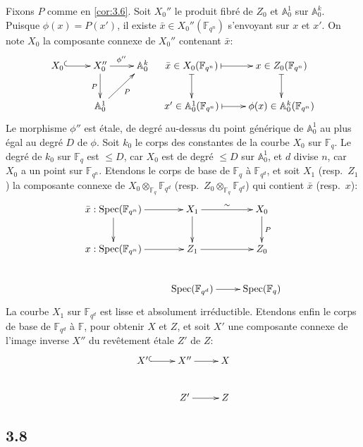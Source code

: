 \documentclass[10pt,a4paper]{article}
\theoremstyle{plain}
\theoremstyle{definition}
\DeclareMathOperator{\Spec}{Spec}
\begin{document}
Fixons $P$ comme en \ref{cor:3.6}. Soit $X_0''$ le produit fibr\'e de $Z_0$ et $\mathbb{A}_0^1$ sur $\mathbb{A}_0^k$. Puisque $\phi(x) = P(x')$, il existe $\bar{x} \in X_0''(\mathbb{F}_{q^n})$ s'envoyant sur $x$ et $x'$. On note $X_0$ la composante connexe de $X_0''$ contenant $\bar{x}$:
\begin{equation}\label{eq:3.7.1}
\xymatrix{
X_0 \ar@{^{(}->}[r] & X_0'' \ar[r]^{\phi''} \ar[d]_{P} & \mathbb{A}_0^k \\
& \mathbb{A}_0^1 \ar[ur]_{P} &
}
\quad
\xymatrix{
\bar{x} \in X_0(\mathbb{F}_{q^n}) \ar@{|->}[d] \ar@{|->}[r] & x \in Z_0(\mathbb{F}_{q^n}) \ar@{|->}[d] \\
x' \in \mathbb{A}_0^1(\mathbb{F}_{q^n}) \ar@{|->}[r] & \phi(x) \in \mathbb{A}_0^k(\mathbb{F}_{q^n})
}
\end{equation}
Le morphisme $\phi''$ est \'etale, de degr\'e au-dessus du point g\'en\'erique de $\mathbb{A}_0^1$ au plus \'egal au degr\'e $D$ de $\phi$. Soit $k_0$ le corps des constantes de la courbe $X_0$ sur $\mathbb{F}_q$. Le degr\'e de $k_0$ sur $\mathbb{F}_q$ est $\leq D$, car $X_0$ est de degr\'e $\leq D$ sur $\mathbb{A}_0^1$, et $d$ divise $n$, car $X_0$ a un point sur $\mathbb{F}_{q^n}$. Etendons le corps de base de $\mathbb{F}_q$ \`a $\mathbb{F}_{q^d}$, et soit $X_1$ (resp.~$Z_1$) la composante connexe de $X_0 \otimes_{\mathbb{F}_q} \mathbb{F}_{q^d}$ (resp.~$Z_0 \otimes_{\mathbb{F}_q} \mathbb{F}_{q^d}$) qui contient $\bar{x}$ (resp.~$x$):
\begin{equation}\label{eq:3.7.2}
\xymatrix{
\bar{x}: \Spec(\mathbb{F}_{q^n}) \ar[r] \ar[d] & X_1 \ar[r]^{\sim} \ar[d] & X_0 \ar[d]^{P} \\
x: \Spec(\mathbb{F}_{q^n}) \ar[r] & Z_1 \ar[r] & Z_0 \\
& \Spec(\mathbb{F}_{q^d}) \ar[r] & \Spec(\mathbb{F}_q)
}
\end{equation}
La courbe $X_1$ sur $\mathbb{F}_{q^d}$ est lisse et absolument irr\'eductible. Etendons enfin le corps de base de $\mathbb{F}_{q^d}$ \`a $\mathbb{F}$, pour obtenir $X$ et $Z$, et soit $X'$ une composante connexe de l'image inverse $X''$ du rev\^etement \'etale $Z'$ de $Z$:
\begin{equation}\label{eq:3.7.3}
\xymatrix{
X' \ar@{^{(}->}[r] & X'' \ar[r] & X \\
& Z' \ar[r] & Z
}
\end{equation}

\subsection*{3.8}
\end{document}
